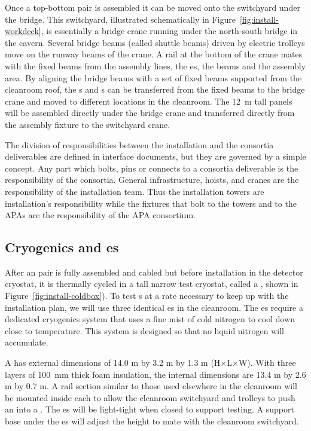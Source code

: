 Once a top-bottom  pair is assembled it can be moved onto the switchyard under the bridge. 
This switchyard, illustrated schematically in Figure~\ref{fig:install-workdeck}, is essentially a bridge crane running under the north-south bridge in the cavern.  
Several bridge beams (called shuttle beams) driven by electric trolleys  move on the runway beams of the crane.  
A rail at the bottom of the crane mates with the fixed beams  from the assembly lines, the \coldbox{}es, the  beams and the  assembly area.
By aligning the bridge beams with a set of fixed beams supported from the cleanroom roof, the s and s can be transferred from the fixed beams to the bridge crane and moved to different locations in the cleanroom. 
The \SI{12}{m} tall  panels will be assembled directly under the bridge crane and transferred directly from the assembly fixture to the switchyard crane.

The division of responsibilities between the installation and the consortia deliverables are defined in interface documents, but they are governed by a simple concept. Any part which bolts, pins or connects to a consortia deliverable is the responsibility of the consortia. General infrastructure, hoists, and cranes are the responsibility of the installation team. Thus the installation towers are installation's responsibility while the fixtures that bolt to the towers and to the APAs are the responsibility of the APA consortium. 


\subsection{Cryogenics and \Coldbox{}es}
\label{sec:fdsp-tc-infr-cryo}



After an  pair is fully assembled and cabled but before installation in the detector cryostat, it is thermally cycled in a tall narrow test cryostat, called a \coldbox{}, shown in Figure~\ref{fig:install-coldbox}). 
To test s at a rate necessary to keep up with the installation plan, we will use three identical \coldbox{}es in the cleanroom. 
The \coldbox{}es require a dedicated cryogenics system that uses a fine mist of cold nitrogen to cool down close to  temperature. This system is designed so that no liquid nitrogen will accumulate. 


A \coldbox has external dimensions of 14.0 \si{m} by 3.2 \si{m} by 1.3 \si{m} (H$\times$L$\times$W). With three layers of \SI{100}{mm} thick foam insulation,  
the internal dimensions are 13.4 \si{m} by 2.6 \si{m} by 0.7 \si{m}. A rail section similar to those used elsewhere in the cleanroom will be mounted inside each \coldbox to allow the cleanroom switchyard and trolleys to push an    into a \coldbox. The \coldbox{}es will be light-tight when closed to support  testing. A support base under the \coldbox{}es will adjust the height to mate with the cleanroom switchyard.


